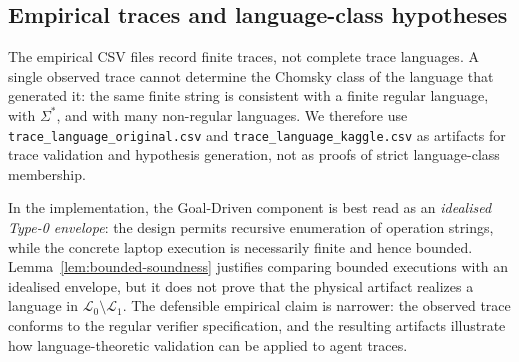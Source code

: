 \subsection{Empirical traces and language-class hypotheses}

The empirical CSV files record finite traces, not complete trace
languages.  A single observed trace cannot determine the Chomsky
class of the language that generated it: the same finite string is
consistent with a finite regular language, with $\Sigma^*$, and
with many non-regular languages.  We therefore use
\texttt{trace\_language\_original.csv} and
\texttt{trace\_language\_kaggle.csv} as artifacts for trace
validation and hypothesis generation, not as proofs of strict
language-class membership.

In the implementation, the Goal-Driven component is best read as an
\emph{idealised Type-0 envelope}: the design permits recursive
enumeration of operation strings, while the concrete laptop
execution is necessarily finite and hence bounded.  Lemma~\ref{lem:bounded-soundness}
justifies comparing bounded executions with an idealised envelope,
but it does not prove that the physical artifact realizes a language
in $\mathcal{L}_0\setminus\mathcal{L}_1$.  The defensible empirical
claim is narrower: the observed trace conforms to the regular
verifier specification, and the resulting artifacts illustrate how
language-theoretic validation can be applied to agent traces.
